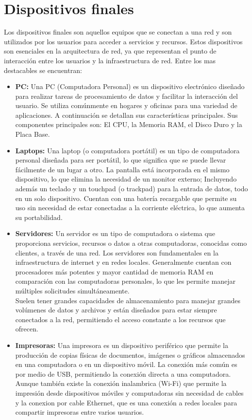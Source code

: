 \documentclass{article}
\begin{document}
\section{Dispositivos finales}
Los dispositivos finales son aquellos equipos que se conectan a una red y son utilizados por los usuarios para acceder a servicios y recursos. Estos dispositivos son esenciales en la arquitectura de red, ya que representan el punto de interacción entre los usuarios y la infraestructura de red. Entre los mas destacables se encuentran:
\begin{itemize}
    \item \textbf{PC:} Una PC (Computadora Personal) es un dispositivo electrónico diseñado para realizar tareas de procesamiento de datos y facilitar la interacción del usuario. Se utiliza comúnmente en hogares y oficinas para una variedad de aplicaciones. A continuación se detallan sus características principales. Sus componentes principales son: El CPU, la Memoria RAM, el Disco Duro y la Placa Base.
    \item \textbf{Laptops:} Una laptop (o computadora portátil) es un tipo de computadora personal diseñada para ser portátil, lo que significa que se puede llevar fácilmente de un lugar a otro. La pantalla está incorporada en el mismo dispositivo, lo que elimina la necesidad de un monitor externo; Incluyendo además un teclado y un touchpad (o trackpad) para la entrada de datos, todo en un solo dispositivo.
    Cuentan con una batería recargable que permite su uso sin necesidad de estar conectadas a la corriente eléctrica, lo que aumenta su portabilidad.
    \item \textbf{Servidores:} Un servidor es un tipo de computadora o sistema que proporciona servicios, recursos o datos a otras computadoras, conocidas como clientes, a través de una red. Los servidores son fundamentales en la infraestructura de internet y en redes locales. Generalmente cuentan con procesadores más potentes y mayor cantidad de memoria RAM en comparación con las computadoras personales, lo que les permite manejar múltiples solicitudes simultáneamente.\\
    Suelen tener grandes capacidades de almacenamiento para manejar grandes volúmenes de datos y archivos y están diseñados para estar siempre conectados a la red, permitiendo el acceso constante a los recursos que ofrecen.
    \item \textbf{Impresoras:} Una impresora es un dispositivo periférico que permite la producción de copias físicas de documentos, imágenes o gráficos almacenados en una computadora o en un dispositivo móvil. La conexión más común es por medio de USB, permitiendo la conexión directa a una computadora. Aunque también existe la conexión inalambrica (Wi-Fi) que permite la impresión desde dispositivos móviles y computadoras sin necesidad de cables y la conexion por cable Ethernet, que es una conexión a redes locales para compartir impresoras entre varios usuarios.
\end{itemize}
\end{document}
